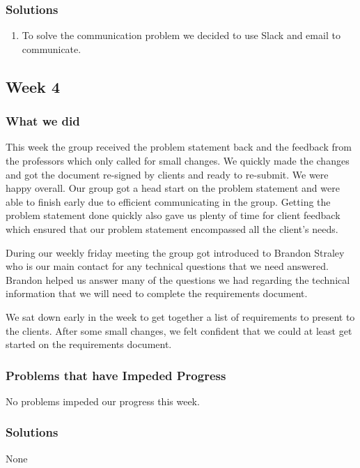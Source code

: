 \documentclass[letterpaper,10pt,titlepage, onecolumn, compsoc]{IEEEtran}
\begin{document}
\subsubsection{Solutions}
\begin{enumerate}
	\item To solve the communication problem we decided to use Slack and email to communicate. 
\end{enumerate}

\subsection{Week 4}


\subsubsection{What we did}
This week the group received the problem statement back and the feedback from the professors which only called for small changes. We quickly made the changes and got the document re-signed by clients and ready to re-submit. We were happy overall. Our group got a head start on the problem statement and were able to finish early due to efficient communicating in the group. Getting the problem statement done quickly also gave us plenty of time for client feedback which ensured that our problem statement encompassed all the client’s needs. 

During our weekly friday meeting the group got introduced to Brandon Straley who is our main contact for any technical questions that we need answered. Brandon helped us answer many of the questions we had regarding the technical information that we will need to complete the requirements document. 

We sat down early in the week to get together a list of requirements to present to the clients. After some small changes, we felt confident that we could at least get started on the requirements document.

\subsubsection{Problems that have Impeded Progress}
No problems impeded our progress this week.

\subsubsection{Solutions}
None
\end{document}
